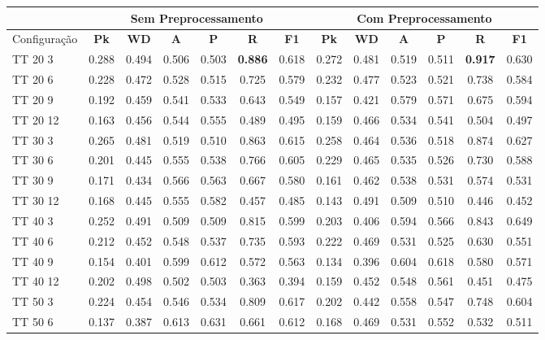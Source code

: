 \documentclass{article}
\begin{document}
 
\begin{tabular}{|l|c|c|c|c|c|c||c|c|c|c|c|c|} 

\hline 
&\multicolumn{6}{c||}{Sem Preprocessamento} & \multicolumn{6}{c|}{Com Preprocessamento}\\
\hline 
Configuração & \textbf{Pk} & \textbf{WD} & \textbf{A } & \textbf{P } & \textbf{R } & \textbf{F1} & \textbf{Pk} & \textbf{WD} & \textbf{A } & \textbf{P } & \textbf{R } & \textbf{F1}\\ \hline
TT 20  3 & 0.288 & 0.494 & 0.506 & 0.503 & \textbf{0.886} & 0.618 & 0.272 & 0.481 & 0.519 & 0.511 & \textbf{0.917} & 0.630\\ \hline
TT 20  6 & 0.228 & 0.472 & 0.528 & 0.515 & 0.725 & 0.579 & 0.232 & 0.477 & 0.523 & 0.521 & 0.738 & 0.584\\ \hline
TT 20  9 & 0.192 & 0.459 & 0.541 & 0.533 & 0.643 & 0.549 & 0.157 & 0.421 & 0.579 & 0.571 & 0.675 & 0.594\\ \hline
TT 20 12 & 0.163 & 0.456 & 0.544 & 0.555 & 0.489 & 0.495 & 0.159 & 0.466 & 0.534 & 0.541 & 0.504 & 0.497\\ \hline
TT 30  3 & 0.265 & 0.481 & 0.519 & 0.510 & 0.863 & 0.615 & 0.258 & 0.464 & 0.536 & 0.518 & 0.874 & 0.627\\ \hline
TT 30  6 & 0.201 & 0.445 & 0.555 & 0.538 & 0.766 & 0.605 & 0.229 & 0.465 & 0.535 & 0.526 & 0.730 & 0.588\\ \hline
TT 30  9 & 0.171 & 0.434 & 0.566 & 0.563 & 0.667 & 0.580 & 0.161 & 0.462 & 0.538 & 0.531 & 0.574 & 0.531\\ \hline
TT 30 12 & 0.168 & 0.445 & 0.555 & 0.582 & 0.457 & 0.485 & 0.143 & 0.491 & 0.509 & 0.510 & 0.446 & 0.452\\ \hline
TT 40  3 & 0.252 & 0.491 & 0.509 & 0.509 & 0.815 & 0.599 & 0.203 & 0.406 & 0.594 & 0.566 & 0.843 & 0.649\\ \hline
TT 40  6 & 0.212 & 0.452 & 0.548 & 0.537 & 0.735 & 0.593 & 0.222 & 0.469 & 0.531 & 0.525 & 0.630 & 0.551\\ \hline
TT 40  9 & 0.154 & 0.401 & 0.599 & 0.612 & 0.572 & 0.563 & 0.134 & 0.396 & 0.604 & 0.618 & 0.580 & 0.571\\ \hline
TT 40 12 & 0.202 & 0.498 & 0.502 & 0.503 & 0.363 & 0.394 & 0.159 & 0.452 & 0.548 & 0.561 & 0.451 & 0.475\\ \hline
TT 50  3 & 0.224 & 0.454 & 0.546 & 0.534 & 0.809 & 0.617 & 0.202 & 0.442 & 0.558 & 0.547 & 0.748 & 0.604\\ \hline
TT 50  6 & 0.137 & 0.387 & 0.613 & 0.631 & 0.661 & 0.612 & 0.168 & 0.469 & 0.531 & 0.552 & 0.532 & 0.511\\ \hline

\end{tabular}
\end{document}
